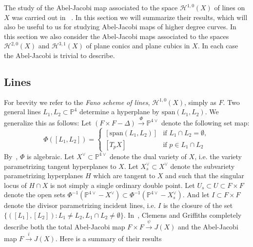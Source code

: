 \documentclass[amssymb,twoside,12 pt,amscd,reqno]{amsart}
\theoremstyle{plain}
\theoremstyle{definition}
\newcommand{\Hdg}[2]{\mathcal{H}^{#1,#2}}
\newcommand{\PP}{\mathbb{P}}
\def\ps{\vspace{4pt}}
\newcommand{\lt}{\left}
\newcommand{\rt}{\right}
\begin{document}
The study of the Abel-Jacobi map associated to the space
$\Hdg{1}{0}(X)$ of lines on $X$ was carried out in  ~\cite{CG}.  
In this section we will summarize their results, which will also be
useful to us for studying Abel-Jacobi maps of higher degree curves.
In this section we also consider the Abel-Jacobi maps associated to
the spaces $\Hdg{2}{0}(X)$ and $\Hdg{3}{1}(X)$ of plane conics and
plane cubics in $X$.  In each case the Abel-Jacobi is trivial to
describe.  

\subsection{Lines}\label{subsec-lines}

For brevity we refer to the \emph{Fano scheme of lines},
$\Hdg{1}{0}(X)$, simply as $F$.  
Two general lines $L_1,L_2\subset \PP^4$ determine a hyperplane by
$\text{span}(L_1,L_2)$.  We generalize this as follows:
Let $(F\times F-\Delta)\xrightarrow{\Phi} 
\PP^{4\vee}$ denote the following set map:
\begin{equation}\label{eqn-16}
 \Phi \left( [L_1,L_2] \right) =
  \left\{ \begin{array}{ll}
    \lt[ \text{span} \left( L_1,L_2 \right)\rt] &\text{if }L_1\cap L_2
  = \emptyset,  \\
  \lt[T_p X\rt]  & \text{if }p\in L_1\cap L_2
 \end{array} \right.
\end{equation} 
By~\cite[lemma 12.16]{CG}, $\Phi$ is algebraic.  
Let $X^\vee\subset \PP^{4\vee}$ denote the dual variety of $X$,
i.e. the variety 
parametrizing tangent hyperplanes to $X$.  Let $X^\vee_s\subset
X^\vee$ denote 
the subvariety parametrizing hyperplanes $H$ which are tangent to $X$ and
such that the singular locus of $H\cap X$ is not simply a single ordinary 
double point.  Let $U_s\subset U\subset F\times F$ denote the open
sets $\Phi^{-1}\lt(\PP^{4\vee} - X^\vee\rt)\subset \Phi^{-1}\lt(\PP^{4\vee} - 
X^\vee_s\rt)$.  And let $I\subset F\times F$ denote the divisor
parametrizing 
incident lines, i.e. $I$ is the closure of the set $\{\lt([L_1],[L_2]\rt) 
: L_1\neq L_2, L_1\cap L_2\neq\emptyset\}$.
In~\cite{CG}, Clemens and Griffiths completely describe both
the total 
Abel-Jacobi map $F\times F\xrightarrow{\psi} J(X)$ and the
Abel-Jacobi map $F\xrightarrow{i} J(X)$.  Here is a summary of their results

\ps
\end{document}
